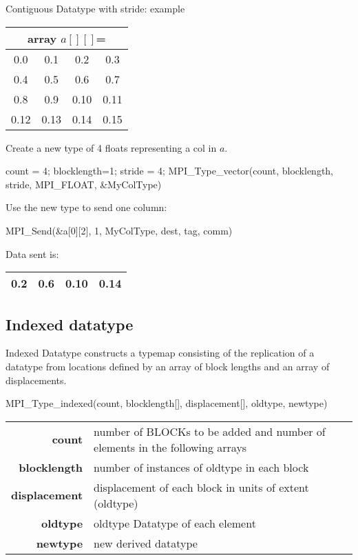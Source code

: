 \documentclass[aspectratio=43]{beamer}
\begin{document}
\begin{frame}[fragile]{Contiguous Datatype with stride: example}
\begin{center}
\begin{tabular}{|c|c|c|c|}
    \multicolumn{4}{c}{array $a[][]$=}\\\hline
0.0  & 0.1  & 0.2  & 0.3\\\hline
0.4  & 0.5  & 0.6  & 0.7\\\hline
0.8  & 0.9  & 0.10 & 0.11\\\hline
0.12 & 0.13 & 0.14 & 0.15\\\hline
\end{tabular}
\end{center}
Create a new type of 4 floats representing a col in $a$.\\
\begin{Pseudolisting}[]{}
count = 4; blocklength=1; stride = 4;
MPI_Type_vector(count, blocklength, stride, MPI_FLOAT, &MyColType)
\end{Pseudolisting}
Use the new type to send one column:\\
\begin{Pseudolisting}[]{}
MPI_Send(&a[0][2], 1, MyColType, dest, tag, comm)
\end{Pseudolisting}
Data sent is:
\begin{tabular}{|c|c|c|c|}
\hline
\color{cscsblue}0.2  & \color{cscsblue}0.6  & \color{cscsblue}0.10 & \color{cscsblue}0.14\\
\hline
\end{tabular}

\end{frame}

\subsection{Indexed datatype}
\begin{frame}[fragile]{Indexed Datatype}
 constructs a typemap consisting of the replication of a datatype from locations defined by an array of block lengths and an array of displacements.
\begin{Pseudolisting}[]{}
MPI_Type_indexed(count, blocklength[], displacement[], 
                 oldtype, newtype)
\end{Pseudolisting}
\begin{black1block}{}
\begin{tabular}{rp{6.4cm}}
\textbf{count} & number of BLOCKs to be added and number of elements in the following arrays\\
\textbf{blocklength} & number of instances of oldtype in each block\\
\textbf{displacement} & displacement of each block in units of extent (oldtype)\\
\textbf{oldtype} & oldtype Datatype of each element\\
\textbf{newtype} & new derived datatype\\
\end{tabular}
\end{black1block}
\end{frame}
\end{document}
